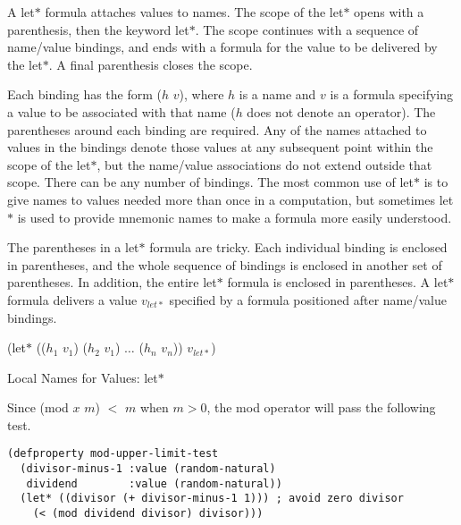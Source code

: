 \begin{aside}
A
\textsf{let$*$}
formula attaches values to names.
The scope of the \textsf{let$*$} opens with a parenthesis,
then the keyword \textsf{let$*$}.
The scope continues with
a sequence of name/value bindings,
and ends with a formula for the value
to be delivered by the \textsf{let$*$}.
A final parenthesis closes the scope.

Each binding has the form ($h$ $v$),
where $h$ is a name and $v$ is a
formula specifying a value to be associated with that name
($h$ does not denote an operator).
The parentheses around each binding are required.
Any of the names attached to values in the bindings
denote those values at any
subsequent point within the scope
of the \textsf{let$*$},
but the name/value associations do not
extend outside that scope.
There can be any number of bindings.
The most common use of \textsf{let$*$} is to give names
to values needed more than once in a computation,
but sometimes \textsf{let$*$} is used to provide mnemonic names
to make a formula more easily understood.

The parentheses in a \textsf{let$*$} formula are tricky.
Each individual binding is enclosed in parentheses,
and the whole sequence of bindings is enclosed in another set
of parentheses. In addition, the entire \textsf{let$*$} formula
is enclosed in parentheses.
A \textsf{let$*$} formula delivers a value $v_{let*}$
specified by a formula positioned after name/value bindings.
\begin{center}
(let$*$ (($h_1$ $v_1$) ($h_2$ $v_1$) $\dots$ ($h_n$ $v_n$)) $v_{let*}$)
\end{center}
\caption{Local Names for Values: \textsf{let$*$}}
\label{let*-def}
\end{aside}

Since (\textsf{mod} $x$ $m$) $<$ $m$ when $m > 0$,
the \textsf{mod} operator will pass the following test.

\begin{Verbatim}
(defproperty mod-upper-limit-test
  (divisor-minus-1 :value (random-natural)
   dividend        :value (random-natural))
  (let* ((divisor (+ divisor-minus-1 1))) ; avoid zero divisor
    (< (mod dividend divisor) divisor)))
\end{Verbatim}

